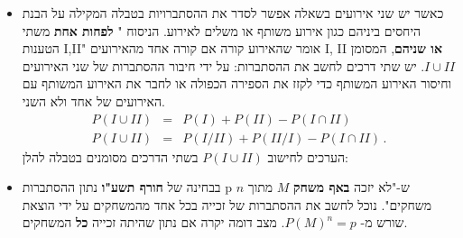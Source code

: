 \documentclass[12pt,a4paper]{article}
\newcommand{\bover}[1]{\bm{\overline{#1}}}
\begin{document}
\begin{itemize}
\item
כאשר יש שני אירועים בשאלה אפשר לסדר את ההסתברויות בטבלה המקילה על הבנת היחסים ביניהם כגון אירוע משותף או משלים לאירוע. הניסוח "%
\textbf{לפחות אחת}
משתי הטענות I,II" אומר שהאירוע קורה אם קורה אחד מהאירועים I, II
\textbf{או שניהם},
המסומן 
$I \cup II$.
יש שתי דרכים לחשב את ההסתברות: על ידי חיבור ההסתברות של שני האירועים וחיסור האירוע המשותף כדי לקזז את הספירה הכפולה או לחבר את האירוע המשותף עם האירועים של אחד ולא השני.
\begin{eqnarray*}
P(I \cup II) &=& P(I) + P(II) - P(I \cap II)\\
P(I \cup II) &=& P(I/ II) + P(II/ I) - P(I \cap II)\,.
\end{eqnarray*}
הערכים לחישוב
$P(I \cup II)$
בשתי הדרכים מסומנים בטבלה להלן:
\begin{center}
\end{center}

\item
בבחינה של
\textbf{חורף תשע"ו}
נתון ההסתברות p ש-"לא יזכה
\textbf{באף משחק}
$M$
מתוך 
$n$
משחקים". נוכל לחשב את ההסתברות של זכייה בכל אחד מהמשחקים על ידי הוצאת שורש מ-%
$P(M)^n=p$.
מצב דומה יקרה אם נתון שהיתה זכייה 
\textbf{כל}
המשחקים.


\end{itemize}
\end{document}
